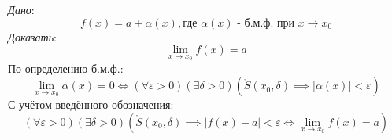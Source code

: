 \begin{sufficiency}
    \textit{Дано}: \[
        f(x) = a + \alpha(x), \text{где } \alpha(x) \text{ - б.м.ф. при } x \to x_0
    \]
    \textit{Доказать}: \[
        \lim_{x \to x_0} f(x) = a
    \]
    По определению б.м.ф.: \[
        \lim_{x \to x_0} \alpha(x) = 0 \iff (\forall \varepsilon > 0)(\exists \delta > 0)(\mathring{S}(x_0, \delta) \implies |\alpha(x)| < \varepsilon)
    \]
    С учётом введённого обозначения: \[
        (\forall \varepsilon > 0)(\exists \delta > 0)(\mathring{S}(x_0, \delta) \implies |f(x) - a| < \varepsilon \iff \lim_{x \to x_0} f(x) = a)
    \]
\end{sufficiency}
